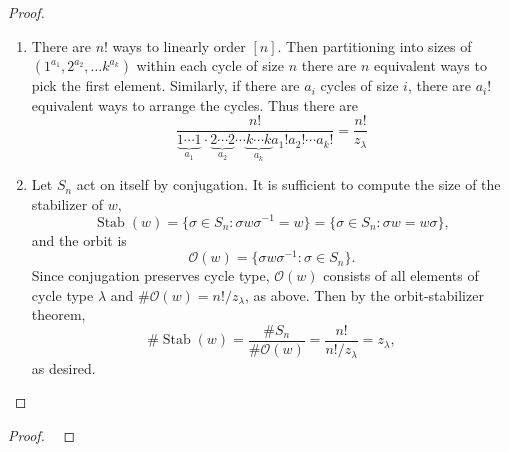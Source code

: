 \documentclass{article}
\newenvironment{problem}[2][Problem]{\begin{trivlist}
\item[\hskip \labelsep {\bfseries #1}\hskip \labelsep {\bfseries #2.}]}{\end{trivlist}}
\newcommand{\set}[1]{\{ #1 \}}
\begin{document}
\begin{proof} ~
  \begin{enumerate}
    \item There are $n!$ ways to linearly order $[n]$. Then partitioning into
    sizes of $(1^{a_1}, 2^{a_2}, \hdots k^{a_k})$ within each cycle of size $n$ there
    are $n$ equivalent ways to pick the first element. Similarly, if there are
    $a_i$ cycles of size $i$, there are $a_i!$ equivalent ways to arrange the
    cycles. Thus there are \[
      \frac{n!}{
        \underbrace{1 \cdots 1}_{a_1} \cdot
        \underbrace{2 \cdots 2}_{a_2} \cdots
        \underbrace{k \cdots k}_{a_k}
        a_1! a_2! \cdots a_k!
      } = \frac{n!}{z_\lambda}
    \]
    \item
    Let $S_n$ act on itself by conjugation. It is sufficient to compute the size
    of the stabilizer of $w$, \[
      \operatorname{Stab}(w)
      = \set { \sigma \in S_n : \sigma w \sigma^{-1} = w}
      = \set{ \sigma \in S_n : \sigma w = w \sigma },
    \]
    and the orbit is \[
      \mathcal O(w) = \set{\sigma w \sigma^{-1} : \sigma \in S_n}.
    \]
    Since conjugation preserves cycle type, $\mathcal O(w)$ consists of all
    elements of cycle type $\lambda$ and $\#\mathcal O(w) = n!/z_\lambda$, as
    above.
    Then by the orbit-stabilizer theorem, \[
      \#\operatorname{Stab}(w)
      = \frac{\#S_n}{\#\mathcal O(w)}
      = \frac{n!}{n!/z_\lambda}
      = z_\lambda,
    \] as desired.
  \end{enumerate}
\end{proof}
\pagebreak
\begin{problem}{5}
\end{problem}

\begin{proof} ~
\end{proof}
\pagebreak
\begin{problem}{6}
\end{problem}
\end{document}
